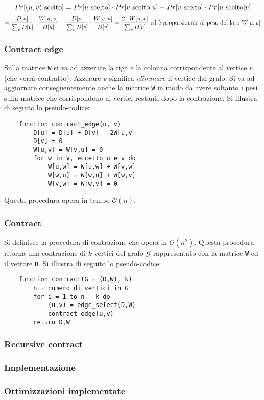 \[
    Pr[(u,v) \textnormal{ scelto}] = Pr[u \textnormal{ scelto}] \cdot 
    Pr[v \textnormal{ scelto} | u] + Pr[v \textnormal{ scelto}] \cdot 
    Pr[u \textnormal{ scelto} | v]
\]
\[
    = \frac{D[u]}{\sum_v D[v]} \cdot \frac{W[u,v]}{D[u]} + \frac{D[v]}{\sum_v D[v]} 
    \cdot \frac{W[v,u]}{D[v]} =
    \frac{2 \cdot W[u,v]}{\sum_v D[v]} \textnormal{ ed è proporzionale al peso del lato } W[u,v]
\]

\subsubsection*{Contract edge}
Sulla matrice \verb|W| si va 
ad azzerare la riga e la colonna corrispondente al vertice $v$ (che verrà 
contratto). Azzerare $v$ significa \textit{eliminare} il vertice dal grafo. Si va 
ad aggiornare conseguentemente anche la matrice \verb|W| in modo da avere soltanto 
i pesi sulla matrice che corrispondono ai vertici restanti dopo la contrazione. 
Si illustra di seguito lo pseudo-codice:
\begin{verbatim}
    function contract_edge(u, v)
        D[u] = D[u] + D[v] - 2W[u,v]
        D[v] = 0
        W[u,v] = W[v,u] = 0
        for w in V, eccetto u e v do
            W[u,w] = W[u,w] + W[v,w]
            W[w,u] = W[w,u] + W[w,v]
            W[v,w] = W[w,v] = 0
\end{verbatim}
Questa procedura opera in tempo $\mathcal{O}(n)$.

\subsubsection*{Contract}
Si definisce la procedura di contrazione che opera in 
$\mathcal{O}(n^2)$. Questa procedura ritorna una contrazione di $k$ vertici del 
grafo $\mathcal{G}$ rappresentato con la matrice \verb|W| ed il vettore \verb|D|.
Si illustra di seguito lo pseudo-codice:
\begin{verbatim}
    function contract(G = (D,W), k)
        n = numero di vertici in G
        for i = 1 to n - k do
            (u,v) = edge_select(D,W)
            contract_edge(u,v)
        return D,W
\end{verbatim}

\subsubsection*{Recursive contract}


\subsubsection{Implementazione}

\subsubsection{Ottimizzazioni implementate}
